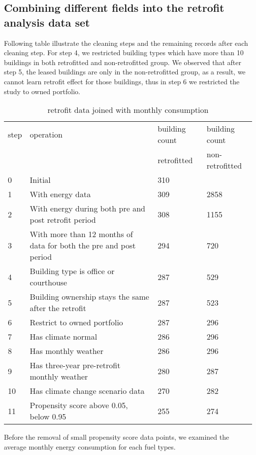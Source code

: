 \documentclass[12pt]{article}
\begin{document}
\subsection{Combining different fields into the retrofit analysis data set}

Following table illustrate the cleaning steps and the remaining records after
each cleaning step. For step 4, we restricted building types which have more
than 10 buildings in both retrofitted and non-retrofitted group. We observed
that after step 5, the leased buildings are only in the non-retrofitted group,
as a result, we cannot learn retrofit effect for those buildings, thus in step 6
we restricted the study to owned portfolio. 

\begin{table}[H]
  \caption{retrofit data joined with monthly consumption}
  \centering
  \fontsize{10}{12}\selectfont
  \begin{tabular}{l|p{5cm}|p{3cm}|p{3cm}}
    \toprule
    step & operation & building count &building count\\
         &           & retrofitted & non-retrofitted\\
    \midrule
    0& Initial & 310 & \\
    1& With energy data & 309 & 2858 \\
    2& With energy during both pre and post retrofit period & 308 &1155 \\
    3& With more than 12 months of data for both the pre and post period & 294 & 720 \\
    4& Building type is office or courthouse & 287 & 529\\
    5& Building ownership stays the same after the retrofit & 287 & 523\\
    6& Restrict to owned portfolio & 287 & 296 \\
    7& Has climate normal & 286 & 296 \\
    8& Has monthly weather & 286 & 296 \\
    9& Has three-year pre-retrofit monthly weather & 280 & 287 \\
    10& Has climate change scenario data& 270 & 282 \\
    11 & Propensity score above 0.05, below 0.95 & 255 & 274 \\
    \bottomrule
  \end{tabular}
  \label{tab:retrofit_clean}
\end{table}
Before the removal of small propensity score data points, we examined the
average monthly energy consumption for each fuel types.
\end{document}
